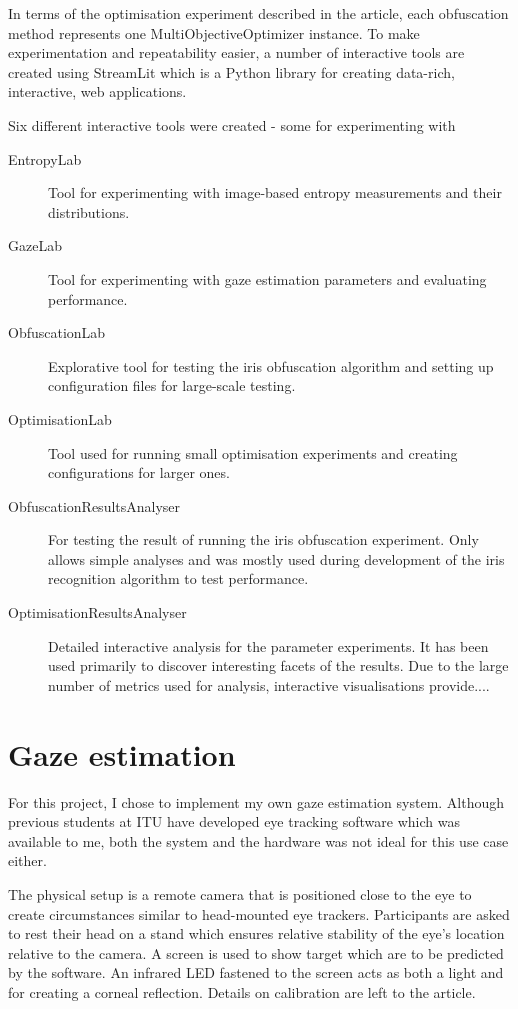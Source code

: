 In terms of the optimisation experiment described in the article, each obfuscation method represents one MultiObjectiveOptimizer instance. To make experimentation and repeatability easier, a number of interactive tools are created using StreamLit which is a Python library for creating data-rich, interactive, web applications.

Six different interactive tools were created - some for experimenting with 
\begin{description}
	\item [EntropyLab] Tool for experimenting with image-based entropy measurements and their distributions.
	\item [GazeLab] Tool for experimenting with gaze estimation parameters and evaluating performance.
	\item [ObfuscationLab] Explorative tool for testing the iris obfuscation algorithm and setting up configuration files for large-scale testing. 
	\item [OptimisationLab] Tool used for running small optimisation experiments and creating configurations for larger ones. 
	\item [ObfuscationResultsAnalyser] For testing the result of running the iris obfuscation experiment. Only allows simple analyses and was mostly used during development of the iris recognition algorithm to test performance.
	\item [OptimisationResultsAnalyser] Detailed interactive analysis for the parameter experiments. It has been used primarily to discover interesting facets of the results. Due to the large number of metrics used for analysis, interactive visualisations provide....
\end{description}


\section{Gaze estimation}
For this project, I chose to implement my own gaze estimation system. Although previous students at ITU have developed eye tracking software which was available to me, both the system and the hardware was not ideal for this use case either. 

The physical setup is a remote camera that is positioned close to the eye to create circumstances similar to head-mounted eye trackers. Participants are asked to rest their head on a stand which ensures relative stability of the eye's location relative to the camera. A screen is used to show target which are to be predicted by the software. An infrared LED fastened to the screen acts as both a light and for creating a corneal reflection. Details on calibration are left to the article.

